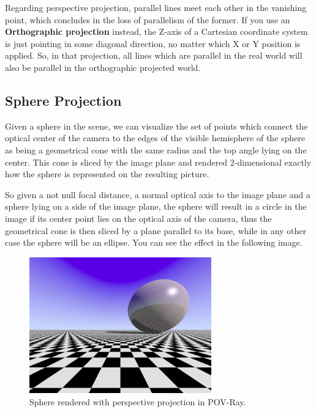 \documentclass[a4paper,12pt]{article}
\begin{document}
	Regarding perspective projection, parallel lines meet each other in the vanishing point, which concludes in the loss of parallelism of the former. If you use an \textbf{Orthographic projection} instead, the Z-axis of a Cartesian coordinate system is just pointing in some diagonal direction, no matter which X or Y position is applied. So, in that projection, all lines which are parallel in the real world will also be parallel in the orthographic projected world.

	
	\subsection{Sphere Projection}
	
	Given a sphere in the scene, we can visualize the set of points which connect the optical center of the camera to the edges of the visible hemisphere of the sphere as being a geometrical cone with the same radius and the top angle lying on the center. This cone is sliced by the image plane and rendered 2-dimensional exactly how the sphere is represented on the resulting picture.
	
	So given a not null focal distance, a normal optical axis to the image plane and a sphere lying on a side of the image plane, the sphere will result in a circle in the image if its center point lies on the optical axis of the camera, thus the geometrical cone is then sliced by a plane parallel to its base, while in any other case the sphere will be an ellipse. You can see the effect in the following image.
	
	\begin{figure}[h!]
		\centering
		\includegraphics[width=0.7\textwidth]{E03.png}
		\caption{Sphere rendered with perspective projection in POV-Ray.}
	\end{figure}
	
	
\end{document}
